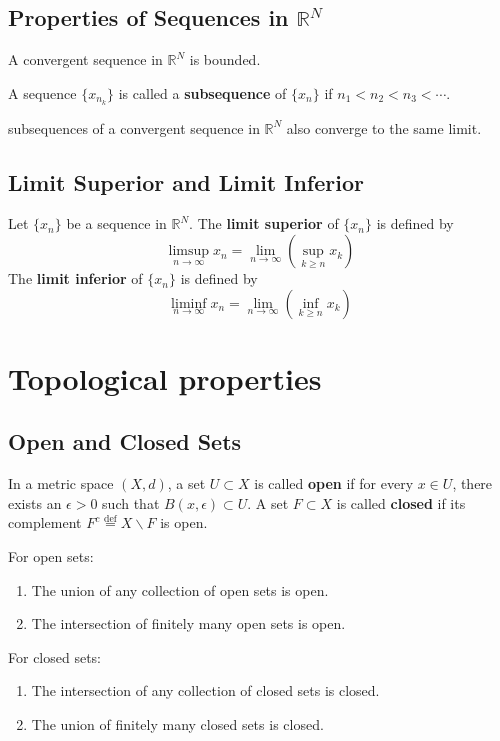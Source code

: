 \subsection{Properties of Sequences in $\mathbb{R}^N$}
\begin{property}
A convergent sequence in $\mathbb{R}^N$ is bounded.
\end{property}

A sequence $\{x_{n_k}\}$ is called a \textbf{subsequence} of $\{x_n\}$ if $n_1 < n_2 < n_3 < \cdots$.

\begin{property}
    subsequences of a convergent sequence in $\mathbb{R}^N$ also converge to the same limit.
\end{property}

\subsection{Limit Superior and Limit Inferior}
\begin{definition}
    Let $\{x_n\}$ be a sequence in $\mathbb{R}^N$. The \textbf{limit superior} of $\{x_n\}$ is defined by $$\limsup_{n \rightarrow \infty} x_n = \lim_{n \rightarrow \infty} \left( \sup_{k \geq n} x_k \right)$$
    The \textbf{limit inferior} of $\{x_n\}$ is defined by $$\liminf_{n \rightarrow \infty} x_n = \lim_{n \rightarrow \infty} \left( \inf_{k \geq n} x_k \right)$$
\end{definition}

\section{Topological properties}
\subsection{Open and Closed Sets}
\begin{definition}
    In a metric space $(X,d)$, a set $U \subset X$ is called \textbf{open} if for every $x \in U$, there exists an $\epsilon > 0$ such that $B(x,\epsilon) \subset U$. A set $F \subset X$ is called \textbf{closed} if its complement $F^c \overset{\text{def}}{=} X \backslash F$ is open.
\end{definition}
\begin{property}
    For open sets:
    \begin{enumerate}
        \item The union of any collection of open sets is open.
        \item The intersection of finitely many open sets is open.
    \end{enumerate}
    For closed sets:
    \begin{enumerate}
        \item The intersection of any collection of closed sets is closed.
        \item The union of finitely many closed sets is closed.
    \end{enumerate}
\end{property}
